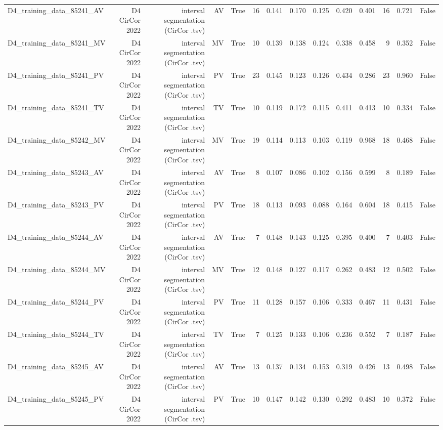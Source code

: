 \begin{table}[htbp]
\begin{tabular}{lrrrrrrrrrrrrr}
    D4\_training\_data\_85241\_AV & D4 CirCor 2022 & interval segmentation (CirCor .tsv) & AV & True & 16 & 0.141 & 0.170 & 0.125 & 0.420 & 0.401 & 16 & 0.721 & False \\
    D4\_training\_data\_85241\_MV & D4 CirCor 2022 & interval segmentation (CirCor .tsv) & MV & True & 10 & 0.139 & 0.138 & 0.124 & 0.338 & 0.458 & 9 & 0.352 & False \\
    D4\_training\_data\_85241\_PV & D4 CirCor 2022 & interval segmentation (CirCor .tsv) & PV & True & 23 & 0.145 & 0.123 & 0.126 & 0.434 & 0.286 & 23 & 0.960 & False \\
    D4\_training\_data\_85241\_TV & D4 CirCor 2022 & interval segmentation (CirCor .tsv) & TV & True & 10 & 0.119 & 0.172 & 0.115 & 0.411 & 0.413 & 10 & 0.334 & False \\
    D4\_training\_data\_85242\_MV & D4 CirCor 2022 & interval segmentation (CirCor .tsv) & MV & True & 19 & 0.114 & 0.113 & 0.103 & 0.119 & 0.968 & 18 & 0.468 & False \\
    D4\_training\_data\_85243\_AV & D4 CirCor 2022 & interval segmentation (CirCor .tsv) & AV & True & 8 & 0.107 & 0.086 & 0.102 & 0.156 & 0.599 & 8 & 0.189 & False \\
    D4\_training\_data\_85243\_PV & D4 CirCor 2022 & interval segmentation (CirCor .tsv) & PV & True & 18 & 0.113 & 0.093 & 0.088 & 0.164 & 0.604 & 18 & 0.415 & False \\
    D4\_training\_data\_85244\_AV & D4 CirCor 2022 & interval segmentation (CirCor .tsv) & AV & True & 7 & 0.148 & 0.143 & 0.125 & 0.395 & 0.400 & 7 & 0.403 & False \\
    D4\_training\_data\_85244\_MV & D4 CirCor 2022 & interval segmentation (CirCor .tsv) & MV & True & 12 & 0.148 & 0.127 & 0.117 & 0.262 & 0.483 & 12 & 0.502 & False \\
    D4\_training\_data\_85244\_PV & D4 CirCor 2022 & interval segmentation (CirCor .tsv) & PV & True & 11 & 0.128 & 0.157 & 0.106 & 0.333 & 0.467 & 11 & 0.431 & False \\
    D4\_training\_data\_85244\_TV & D4 CirCor 2022 & interval segmentation (CirCor .tsv) & TV & True & 7 & 0.125 & 0.133 & 0.106 & 0.236 & 0.552 & 7 & 0.187 & False \\
    D4\_training\_data\_85245\_AV & D4 CirCor 2022 & interval segmentation (CirCor .tsv) & AV & True & 13 & 0.137 & 0.134 & 0.153 & 0.319 & 0.426 & 13 & 0.498 & False \\
    D4\_training\_data\_85245\_PV & D4 CirCor 2022 & interval segmentation (CirCor .tsv) & PV & True & 10 & 0.147 & 0.142 & 0.130 & 0.292 & 0.483 & 10 & 0.372 & False \\

\end{tabular}
\end{table}
